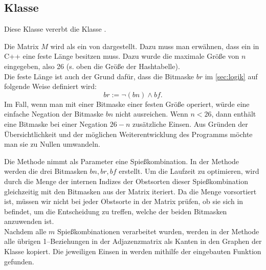 \subsection{Klasse }
Diese Klasse vererbt die Klasse .

Die Matrix $M$ wird als ein  von  dargestellt.
Dazu muss man erwähnen, dass ein  in C++ eine feste Länge besitzen muss.
Dazu wurde die maximale Größe von $n$ eingegeben, also 26 (s. oben die Größe der Hashtabelle).\\
Die feste Länge ist auch der Grund dafür, dass die Bitmaske $br$ im \cref{sec:logik}
auf folgende Weise definiert wird:
\[
br := \neg(bn) \land bf.
\]
Im Fall, wenn man mit einer Bitmaske einer festen Größe operiert, würde 
eine einfache Negation der Bitmaske $bn$ nicht ausreichen. Wenn $n < 26$, dann enthält 
eine Bitmaske bei einer Negation $26 - n$ zusätzliche Einsen. Aus Gründen der Übersichtlichkeit 
und der möglichen Weiterentwicklung des Programms möchte man sie zu Nullen umwandeln.





Die Methode  nimmt als Parameter eine Spießkombination. 
In der Methode werden die drei Bitmasken $bn, br, bf$ erstellt.
Um die Laufzeit zu optimieren, wird durch die Menge der internen Indizes der Obstsorten 
dieser Spießkombination  gleichzeitig mit den Bitmasken aus der Matrix iteriert.
Da die Menge  vorsortiert ist, müssen wir nicht bei jeder Obstsorte in der Matrix
prüfen, ob sie sich in  befindet, um die Entscheidung zu treffen, welche der beiden
Bitmasken anzuwenden ist.\\
Nachdem alle $m$ Spießkombinationen verarbeitet wurden, werden in der Methode 
alle übrigen 1--Beziehungen in der Adjazenzmatrix
als Kanten in den Graphen  der Klasse  kopiert. 
Die jeweiligen Einsen in  werden mithilfe der eingebauten Funktion 
gefunden.

